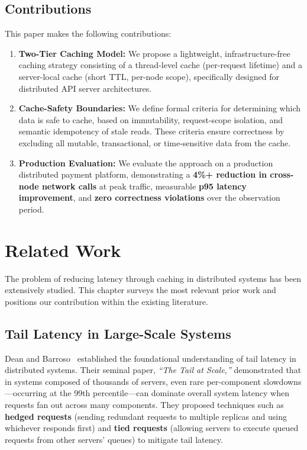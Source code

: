 \documentclass[12pt,a4paper]{report}
\begin{document}
\section{Contributions}

This paper makes the following contributions:

\begin{enumerate}
    \item \textbf{Two-Tier Caching Model:} We propose a lightweight, infrastructure-free caching strategy consisting of a thread-level cache (per-request lifetime) and a server-local cache (short TTL, per-node scope), specifically designed for distributed API server architectures.

    \item \textbf{Cache-Safety Boundaries:} We define formal criteria for determining which data is safe to cache, based on immutability, request-scope isolation, and semantic idempotency of stale reads. These criteria ensure correctness by excluding all mutable, transactional, or time-sensitive data from the cache.

    \item \textbf{Production Evaluation:} We evaluate the approach on a production distributed payment platform, demonstrating a \textbf{4\%+ reduction in cross-node network calls} at peak traffic, measurable \textbf{p95 latency improvement}, and \textbf{zero correctness violations} over the observation period.
\end{enumerate}


\chapter{Related Work}

The problem of reducing latency through caching in distributed systems has been extensively studied. This chapter surveys the most relevant prior work and positions our contribution within the existing literature.

\section{Tail Latency in Large-Scale Systems}

Dean and Barroso~\cite{dean2013tail} established the foundational understanding of tail latency in distributed systems. Their seminal paper, \textit{``The Tail at Scale,''} demonstrated that in systems composed of thousands of servers, even rare per-component slowdowns—occurring at the 99th percentile—can dominate overall system latency when requests fan out across many components. They proposed techniques such as \textbf{hedged requests} (sending redundant requests to multiple replicas and using whichever responds first) and \textbf{tied requests} (allowing servers to execute queued requests from other servers' queues) to mitigate tail latency.
\end{document}
